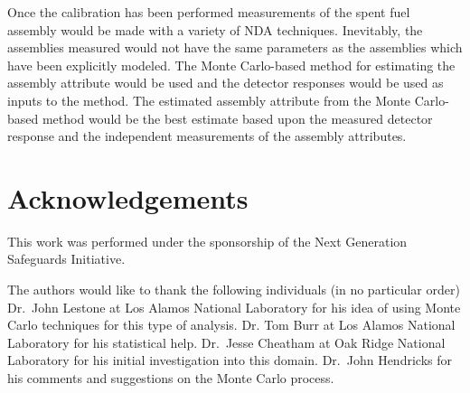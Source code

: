 \documentclass{ansnse}
\begin{document}
Once the calibration has been performed measurements of the spent fuel assembly would be made with a variety of NDA techniques.  Inevitably, the assemblies measured would not have the same parameters as the assemblies which have been explicitly modeled.  The Monte Carlo-based method for estimating the assembly attribute would be used and the detector responses would be used as inputs to the method.  The estimated assembly attribute from the Monte Carlo-based method would be the best estimate based upon the measured detector response and the independent measurements of the assembly attributes.

\section{Acknowledgements}
This work was performed under the sponsorship of the Next Generation Safeguards Initiative.

The authors would like to thank the following individuals (in no particular order) Dr.~John Lestone at Los Alamos National Laboratory for his idea of using Monte Carlo techniques for this type of analysis.  Dr. Tom Burr at Los Alamos National Laboratory for his statistical help.  Dr.~Jesse Cheatham at Oak Ridge National Laboratory for his initial investigation into this domain.  Dr.~John Hendricks for his comments and suggestions on the Monte Carlo process.  


\end{document}
